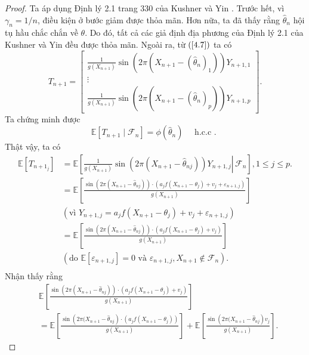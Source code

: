 \begin{proof}
Ta áp dụng Định lý 2.1 trang 330 của Kushner và Yin \cite{kushner}. Trước hết, vì $\gamma_{n}=1 / n$, điều kiện ở bước giảm được thỏa mãn. Hơn nữa, ta đã thấy rằng $\widehat{\theta}_{n}$ hội tụ hầu chắc chắn về $\theta$. Do đó, tất cả các giả định địa phương của Định lý 2.1 của Kushner và Yin \cite{kushner} đều được thỏa mãn. Ngoài ra, từ $\left(\ref{4.7}\right)$ ta có 
$$
T_{n+1}=\left[\begin{array}{c}
\frac{1}{g\left(X_{n+1}\right)} \sin \left(2 \pi\left(X_{n+1}-(\hat{\theta}_{n})_1\right)\right) Y_{n+1,1} \\
\vdots\\
\frac{1}{g\left(X_{n+1}\right)} \sin \left(2 \pi\left(X_{n+1}-(\hat{\theta}_{n})_p\right)\right) Y_{n+1, p}
\end{array}\right].
$$
Ta chứng minh được
$$
\mathbb{E}\left[T_{n+1} \mid \mathcal{F}_{n}\right]=\phi\left(\widehat{\theta}_{n}\right) \quad \text { h.c.c . }
$$
Thật vậy, ta có
    $$
    \begin{aligned}
        \mathbb{E}\left[T_{n+1_j}\right]&=\mathbb{E}\left[\left.\frac{1}{g\left(X_{n+1}\right)} \sin \left(2 \pi\left(X_{n+1}-\hat{\theta}_{n j}\right)\right) Y_{n+1, j} \right\rvert\, \mathcal{F}_n\right], 1 \leq j \leq p.\\
        &=\mathbb{E}\left[\frac{\sin \left(2 \pi\left(X_{n+1}-\hat{\theta}_{n j}\right)\right) \cdot\left(a_j f\left(X_{n+1}-\theta_j\right)+v_j + \varepsilon_{n+1,j}\right)}{g\left(X_{n+1}\right)}\right] \\
        &\left(\text{vì }  Y_{n+1, j}=a_{j} f\left(X_{n+1}-\theta_{j}\right)+v_{j}+\varepsilon_{n+1, j}  \right) \\
        &=\mathbb{E}\left[\frac{\sin \left(2 \pi\left(X_{n+1}-\hat{\theta}_{n j}\right)\right) \cdot\left(a_j f\left(X_{n+1}-\theta_j\right)+v_j \right)}{g\left(X_{n+1}\right)}\right] \\
        &\left(\text{do } \mathbb{E}\left[\varepsilon_{n+1, j}\right]=0 \text { và } \varepsilon_{n+1,j} , X_{n+1} \notin \mathcal{F}_n\right). \\
    \end{aligned}
$$
Nhận thấy rằng
$$
\begin{aligned}
    &\mathbb{E}\left[\frac{\sin \left(2 \pi\left(X_{n+1}-\hat{\theta}_{n j}\right)\right) \cdot\left(a_j f\left(X_{n+1}-\theta_j\right)+v_j \right)}{g\left(X_{n+1}\right)}\right] \\
    &=\mathbb{E}\left[\frac{\sin \left(2 \pi ( X_ { n + 1 } - \hat { \theta } _ { n j } \right) \cdot \left(a_jf\left(X_{n+1}-\theta_j\right)\right)}{g\left(X_{n+1}\right)}\right] + \mathbb{E}\left[\frac{\sin \left(2 \pi ( X_ { n + 1 } - \hat { \theta } _ { n j } \right)v_j}{g\left(X_{n+1}\right)}\right].

\end{aligned}$$
\end{proof}
